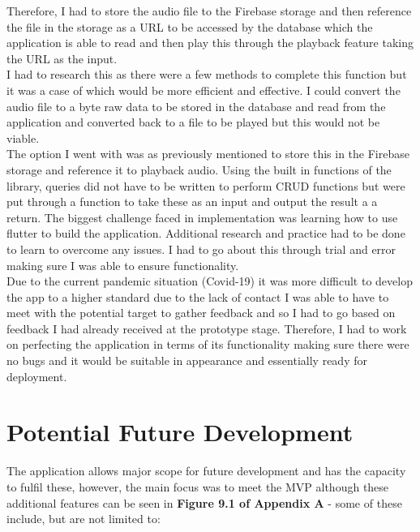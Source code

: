 \documentclass[oneside]{report}
\begin{document}
Therefore, I had to store the audio file to the Firebase storage and then reference the file in the storage as a URL to be accessed by the database which the application is able to read and then play this through the playback feature taking the URL as the input.\\

I had to research this as there were a few methods to complete this function but it was a case of which would be more efficient and effective. I could convert the audio file to a byte raw data to be stored in the database and read from the application and converted back to a file to be played but this would not be viable. \\

The option I went with was as previously mentioned to store this in the Firebase storage and reference it to playback audio. Using the built in functions of the library, queries did not have to be written to perform CRUD functions but were put through a function to take these as an input and output the result a a return. The biggest challenge faced in implementation was learning how to use flutter to build the application. Additional research and practice had to be done to learn to overcome any issues. I had to go about this through trial and error making sure I was able to ensure functionality. \\

Due to the current pandemic situation (Covid-19) it was more difficult to develop the app to a higher standard due to the lack of contact I was able to have to meet with the potential target to gather feedback and so I had to go based on feedback I had already received at the prototype stage. Therefore, I had to work on perfecting the application in terms of its functionality making sure there were no bugs and it would be suitable in appearance and essentially ready for deployment. 

	\section{Potential Future Development}
	The application allows major scope for future development and has the capacity to fulfil these, however, the main focus was to meet the MVP although these additional features can be seen in \textbf{Figure 9.1 of Appendix A} - some of these include, but are not limited to:
\end{document}
